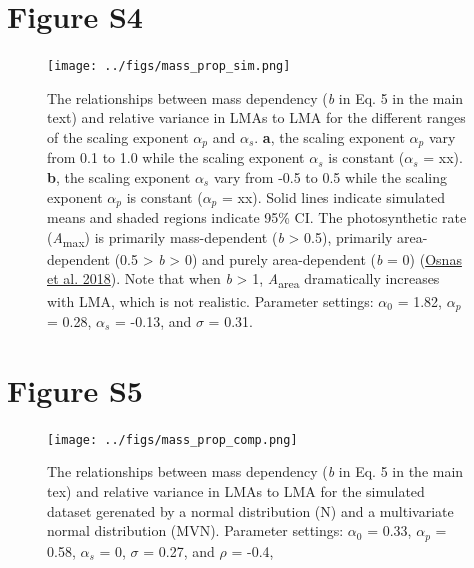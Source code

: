 \documentclass[
  12pt,
  letterpaper,
  DIV=11,
  numbers=noendperiod]{scrartcl}
\begin{document}
\newpage

\hypertarget{figure-s4}{%
\section{Figure S4}\label{figure-s4}}

\begin{figure}

{\centering \texttt{[image: ../figs/mass\_prop\_sim.png]}

}

\caption{\label{fig-mass_prop_sim}The relationships between mass
dependency (\emph{b} in Eq. 5 in the main text) and relative variance in
LMAs to LMA for the different ranges of the scaling exponent
\(\alpha_p\) and \(\alpha_s\). \textbf{a}, the scaling exponent
\(\alpha_p\) vary from 0.1 to 1.0 while the scaling exponent
\(\alpha_s\) is constant (\(\alpha_s\) = xx). \textbf{b}, the scaling
exponent \(\alpha_s\) vary from -0.5 to 0.5 while the scaling exponent
\(\alpha_p\) is constant (\(\alpha_p\) = xx). Solid lines indicate
simulated means and shaded regions indicate 95\% CI. The photosynthetic
rate (\emph{A}\textsubscript{max}) is primarily mass-dependent (\emph{b}
\textgreater{} 0.5), primarily area-dependent (0.5 \textgreater{}
\emph{b} \textgreater{} 0) and purely area-dependent (\emph{b} = 0)
(\protect\hyperlink{ref-Osnas2018}{Osnas et al. 2018}). Note that when
\emph{b} \textgreater{} 1, \emph{A}\textsubscript{area} dramatically
increases with LMA, which is not realistic. Parameter settings:
\(\alpha_0\) = 1.82, \(\alpha_p\) = 0.28, \(\alpha_s\) = -0.13, and
\(\sigma\) = 0.31.}

\end{figure}

\newpage

\hypertarget{figure-s5}{%
\section{Figure S5}\label{figure-s5}}

\begin{figure}

{\centering \texttt{[image: ../figs/mass\_prop\_comp.png]}

}

\caption{\label{fig-mass_prop_comp}The relationships between mass
dependency (\emph{b} in Eq. 5 in the main tex) and relative variance in
LMAs to LMA for the simulated dataset gerenated by a normal distribution
(N) and a multivariate normal distribution (MVN). Parameter settings:
\(\alpha_0\) = 0.33, \(\alpha_p\) = 0.58, \(\alpha_s\) = 0, \(\sigma\) =
0.27, and \(\rho\) = -0.4,}

\end{figure}
\end{document}
